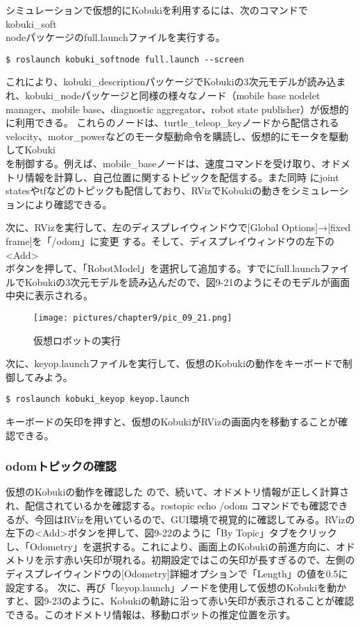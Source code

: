 シミュレーションで仮想的にKobukiを利用するには、次のコマンドでkobuki\_soft\\nodeパッケージのfull.launchファイルを実行する。

\begin{lstlisting}[language=ROS]
$ roslaunch kobuki_softnode full.launch --screen
\end{lstlisting}

これにより、kobuki\_descriptionパッケージでKobukiの3次元モデルが読み込まれ、kobuki\_nodeパッケージと同様の様々なノード（mobile base nodelet manager、mobile base、diagnostic aggregator、robot state publisher）が仮想的に利用できる。
これらのノードは、turtle\_teleop\_keyノードから配信されるvelocity、motor\_powerなどのモータ駆動命令を購読し、仮想的にモータを駆動してKobuki\\を制御する。例えば、mobile\_baseノードは、速度コマンドを受け取り、オドメトリ情報を計算し、自己位置に関するトピックを配信する。また同時
にjoint statesやtfなどのトピックも配信しており、RVizでKobukiの動きをシミュレーションにより確認できる。

次に、RVizを実行して、左のディスプレイウィンドウで[Global Options]→[fixed frame]を「/odom」に変更  する。そして、ディスプレイウィンドウの左下の<Add>\\ボタンを押して、「RobotModel」を選択して追加する。すでにfull.launchファイルでKobukiの3次元モデルを読み込んだので、図9-21のようにそのモデルが画面中央に表示される。

\begin{figure}[htp]
  \centering
  \texttt{[image: pictures/chapter9/pic\_09\_21.png]}
  \caption{仮想ロボットの実行}
\end{figure}

次に、keyop.launchファイルを実行して、仮想のKobukiの動作をキーボードで制御してみよう。

\begin{lstlisting}[language=ROS]
$ roslaunch kobuki_keyop keyop.launch
\end{lstlisting}

キーボードの矢印を押すと、仮想のKobukiがRVizの画面内を移動することが確認できる。

\subsubsection{odomトピックの確認}

仮想のKobukiの動作を確認した  ので、続いて、オドメトリ情報が正しく計算され、配信されているかを確認する。rostopic echo /odom コマンドでも確認できるが、今回はRVizを用いているので、GUI環境で視覚的に確認してみる。RVizの左下の<Add>ボタンを押して、図9-22のように「By Topic」タブをクリックし、「Odometry」を選択する。これにより、画面上のKobukiの前進方向に、オドメトリを示す赤い矢印が現れる。初期設定ではこの矢印が長すぎるので、左側のディスプレイウィンドウの[Odometry]詳細オプションで「Length」の値を0.5に設定する。
次に、再び「keyop.launch」ノードを使用して仮想のKobukiを動かすと、図9-23のように、Kobukiの軌跡に沿って赤い矢印が表示されることが確認できる。このオドメトリ情報は、移動ロボットの推定位置を示す。


